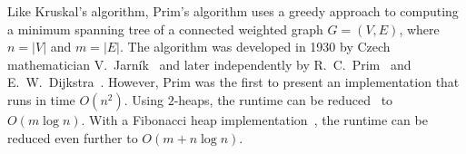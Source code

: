 Like Kruskal's algorithm,
Prim's algorithm uses a
greedy approach to computing a
minimum spanning tree of a connected
weighted graph $G = (V,E)$, where $n = |V|$ and
$m = |E|$. The algorithm was developed in 1930 by Czech mathematician
V.~Jarn\'ik~\cite{Jarnik1930} and later
independently by R.~C.~Prim~\cite{Prim1957} and
E.~W.~Dijkstra~\cite{Dijkstra1959}. However,
Prim was the first to present an implementation
that runs in time $O(n^2)$. Using $2$-heaps, the
runtime can be reduced~\cite{KershenbaumVanSlyke1972} to
$O(m \log n)$. With a Fibonacci heap
implementation~\cite{FredmanTarjan1984,FredmanTarjan1987}, the runtime
can be reduced even further to $O(m + n \log n)$.

